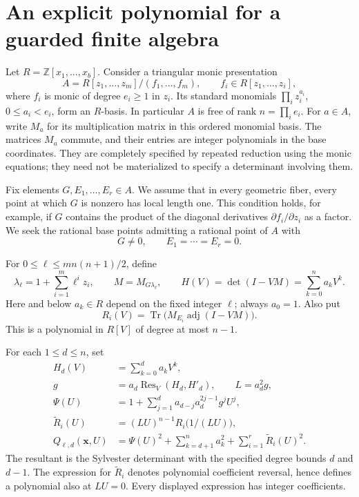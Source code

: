 \section{An explicit polynomial for a guarded finite algebra}
\label{sec:explicit-finite-algebra}

Let $R=\mathbb Z[x_1,\ldots,x_b]$. Consider a triangular monic presentation
\[
 A=R[z_1,\ldots,z_m]/(f_1,\ldots,f_m),\qquad
 f_i\in R[z_1,\ldots,z_i],
\]
where $f_i$ is monic of degree $e_i\ge1$ in $z_i$. Its standard
monomials $\prod_i z_i^{a_i}$, $0\le a_i<e_i$, form an $R$-basis.
In particular $A$ is free of rank $n=\prod_i e_i$. For $a\in A$,
write $M_a$ for its multiplication matrix in this ordered monomial basis.
The matrices $M_a$ commute, and their entries are integer polynomials in
the base coordinates. They are completely specified by repeated reduction
using the monic equations; they need not be materialized to specify a
determinant involving them.

Fix elements $G,E_1,\ldots,E_r\in A$. We assume that in every geometric
fiber, every point at which $G$ is nonzero has local length one. This
condition holds, for example, if $G$ contains the product of the diagonal
derivatives $\partial f_i/\partial z_i$ as a factor. We seek the rational
base points admitting a rational point of $A$ with
\[
 G\ne0,\qquad E_1=\cdots=E_r=0.
\]

For $0\le\ell\le m n(n+1)/2$, define
\[
 \lambda_\ell=1+\sum_{i=1}^m\ell^i z_i,\qquad
 M=M_{G\lambda_\ell},\qquad
 H(V)=\det(I-VM)=\sum_{k=0}^n a_kV^k.
\]
Here and below $a_k\in R$ depend on the fixed integer $\ell$; always
$a_0=1$. Also put
\[
 R_i(V)=\operatorname{Tr}\bigl(M_{E_i}\operatorname{adj}(I-VM)\bigr).
\]
This is a polynomial in $R[V]$ of degree at most $n-1$.

For each $1\le d\le n$, set
\begin{align*}
 H_d(V)&=\sum_{k=0}^d a_kV^k,\\
 g&=a_d\operatorname{Res}_{V}(H_d,H'_d),\qquad L=a_d^2g,\\
 \Psi(U)&=1+\sum_{j=1}^d a_{d-j}a_d^{2j-1}g^jU^j,\\
 \widetilde R_i(U)&=(LU)^{n-1}R_i\bigl(1/(LU)\bigr),\\
 Q_{\ell,d}(\mathbf x,U)&=
 \Psi(U)^2+\sum_{k=d+1}^n a_k^2+\sum_{i=1}^r\widetilde R_i(U)^2.
\end{align*}
The resultant is the Sylvester determinant with the specified degree
bounds $d$ and $d-1$. The expression for $\widetilde R_i$ denotes
polynomial coefficient reversal, hence defines a polynomial also at
$LU=0$. Every displayed expression has integer coefficients.

